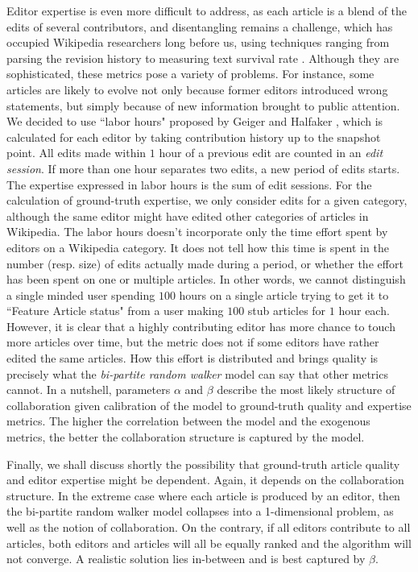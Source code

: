 Editor expertise is even more difficult to address, as each article is a blend of the edits of several contributors, and disentangling remains a challenge, which has occupied Wikipedia researchers long before us, using techniques ranging from parsing the revision history to measuring text survival rate \cite{adler2008measuringauthor}. Although they are sophisticated, these metrics pose a variety of problems. For instance, some articles are likely to evolve not only because former editors introduced wrong statements, but simply because of new information brought to public attention. We decided to use ``labor hours" proposed by Geiger and Halfaker \cite{geiger2013}, which is calculated for each editor by taking contribution history up to the snapshot point. All edits made within $1$ hour of a previous edit are counted in an {\it edit session}. If more than one hour separates two edits, a new period of edits  starts. 
 The expertise expressed in labor hours is the sum of edit sessions. For the calculation of ground-truth expertise, we only consider edits for a given category, although the same editor might have edited other categories of articles in Wikipedia. The labor hours doesn't incorporate only the time effort spent by  editors on a Wikipedia category. It does not tell how this time is spent in the number (resp. size) of edits actually made during a period, or whether the effort has been spent on one or multiple articles. In other words, we cannot distinguish a single minded user spending $100$ hours on a single article trying to get it to ``Feature Article status" from a user making $100$ stub articles for $1$ hour each.  However, it is clear that a highly contributing editor has more chance to touch more articles over time, but the metric does not if some editors have rather edited the same articles. How this effort is distributed and brings quality is precisely what the {\it bi-partite random walker} model can say that other metrics cannot.  In a nutshell, parameters $\alpha$ and $\beta$ describe the most likely structure of collaboration given calibration of the model to ground-truth quality and expertise metrics. The higher the correlation between the model and the exogenous metrics, the better the collaboration structure is captured by the model. 

Finally, we shall discuss shortly the possibility that ground-truth article quality and editor expertise might be dependent. Again, it depends on the collaboration structure. In the extreme case where each article is produced by an editor, then the bi-partite random walker model collapses into a 1-dimensional problem, as well as the notion of collaboration. On the contrary, if all editors contribute to all articles, both editors and articles will all be equally ranked and the algorithm will not converge. A realistic solution lies in-between and is best captured by $\beta$.

